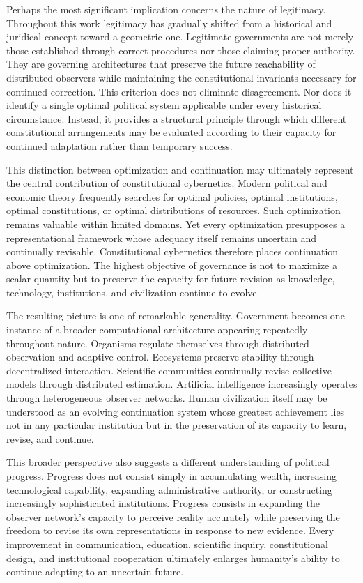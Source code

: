 \documentclass[12pt,a4paper]{article}
\begin{document}
Perhaps the most significant implication concerns the nature of legitimacy. Throughout this work legitimacy has gradually shifted from a historical and juridical concept toward a geometric one. Legitimate governments are not merely those established through correct procedures nor those claiming proper authority. They are governing architectures that preserve the future reachability of distributed observers while maintaining the constitutional invariants necessary for continued correction. This criterion does not eliminate disagreement. Nor does it identify a single optimal political system applicable under every historical circumstance. Instead, it provides a structural principle through which different constitutional arrangements may be evaluated according to their capacity for continued adaptation rather than temporary success.

This distinction between optimization and continuation may ultimately represent the central contribution of constitutional cybernetics. Modern political and economic theory frequently searches for optimal policies, optimal institutions, optimal constitutions, or optimal distributions of resources. Such optimization remains valuable within limited domains. Yet every optimization presupposes a representational framework whose adequacy itself remains uncertain and continually revisable. Constitutional cybernetics therefore places continuation above optimization. The highest objective of governance is not to maximize a scalar quantity but to preserve the capacity for future revision as knowledge, technology, institutions, and civilization continue to evolve.

The resulting picture is one of remarkable generality. Government becomes one instance of a broader computational architecture appearing repeatedly throughout nature. Organisms regulate themselves through distributed observation and adaptive control. Ecosystems preserve stability through decentralized interaction. Scientific communities continually revise collective models through distributed estimation. Artificial intelligence increasingly operates through heterogeneous observer networks. Human civilization itself may be understood as an evolving continuation system whose greatest achievement lies not in any particular institution but in the preservation of its capacity to learn, revise, and continue.

This broader perspective also suggests a different understanding of political progress. Progress does not consist simply in accumulating wealth, increasing technological capability, expanding administrative authority, or constructing increasingly sophisticated institutions. Progress consists in expanding the observer network's capacity to perceive reality accurately while preserving the freedom to revise its own representations in response to new evidence. Every improvement in communication, education, scientific inquiry, constitutional design, and institutional cooperation ultimately enlarges humanity's ability to continue adapting to an uncertain future.
\end{document}
